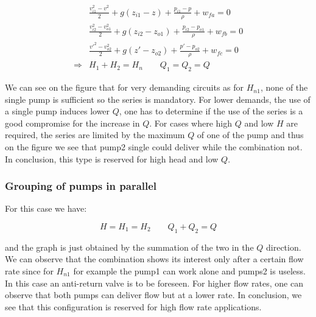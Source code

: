 \begin{equation}
\begin{aligned}
&\frac{v_{i1}^2-v^2}{2}  +g (z_{i1}-z) + \frac{p_{i1}-p}{\rho} + w_{fa}=0 \\
&\frac{v_{i2}^2-v^2_{o1}}{2}  +g (z_{i2}-z_{o1}) + \frac{p_{i2}-p_{o1}}{\rho} + w_{fb}=0\\
&\frac{{v'}^2-v^2_{o2}}{2}  +g (z'-z_{o2}) + \frac{p'-p_{o2}}{\rho} + w_{fc}=0\\
\Rightarrow & H_1 + H_2 = H_n\qquad Q_1 = Q_2 = Q
\end{aligned}
\end{equation}

We can see on the figure that for very demanding circuits as for $H_{n1}$, none of the single pump is sufficient so the series is mandatory. For lower demands, the use of a single pump induces lower $Q$, one has to determine if the use of the series is a good compromise for the increase in $Q$. For cases where high $Q$ and low $H$ are required, the series are limited by the maximum $Q$ of one of the pump and thus on the figure we see that pump2 single could deliver while the combination not. In conclusion, this type is reserved for high head and low $Q$. 

\subsubsection{Grouping of pumps in parallel}
For this case we have: 

\begin{equation}
H = H_1 = H_2 \qquad Q_1  +Q_2 = Q
\end{equation}

and the graph is just obtained by the summation of the two in the $Q$ direction. We can observe that the combination shows its interest only after a certain flow rate since for $H_{n1}$ for example the pump1 can work alone and pumps2 is useless. In this case an anti-return valve is to be foreseen. For higher flow rates, one can observe that both pumps can deliver flow but at a lower rate. In conclusion, we see that this configuration is reserved for high flow rate applications. 
